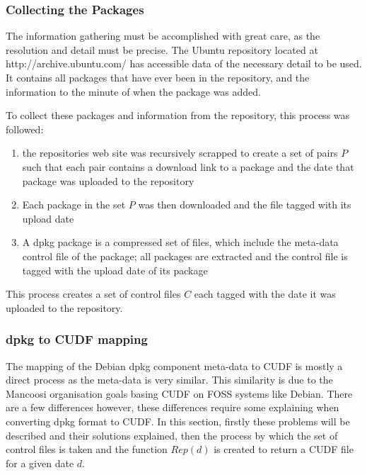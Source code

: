 \subsubsection{Collecting the Packages}
The information gathering must be accomplished with great care, as the resolution and detail must be precise.
The Ubuntu repository located at http://archive.ubuntu.com/ has accessible data of the necessary detail to be used.
It contains all packages that have ever been in the repository, and the information to the minute of when the package was added.

To collect these packages and information from the repository, this process was followed:
\begin{enumerate}
  \item the repositories web site was recursively scrapped to create a set of pairs $P$ 
  such that each pair contains a download link to a package and the date that package was uploaded to the repository
  \item Each package in the set $P$ was then downloaded and the file tagged with its upload date
  \item A dpkg package is a compressed set of files, 
  which include the meta-data control file of the package; all packages are extracted and the control file is tagged with the upload date of its package 
\end{enumerate}

This process creates a set of control files $C$ each tagged with the date it was uploaded to the repository.

\subsubsection{dpkg to CUDF mapping}
\label{ubuntusimulation.debtocudf}
The mapping of the Debian dpkg component meta-data to CUDF is mostly a direct process as the meta-data is very similar.
This similarity is due to the Mancoosi organisation goals basing CUDF on FOSS systems like Debian.  
There are a few differences however, these differences require some explaining when converting dpkg format to CUDF.
In this section, firstly these problems will be described and their solutions explained, 
then the process by which the set of control files is taken and the function $Rep(d)$ is created to return a CUDF file for a given date $d$.

